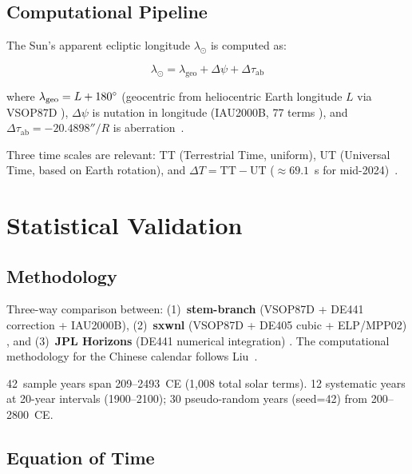 \documentclass[10pt,a4paper]{article}
\begin{document}
\subsection{Computational Pipeline}
\label{subsec:pipeline}

The Sun's apparent ecliptic longitude $\lambda_\odot$ is computed as:

\begin{equation}
  \lambda_\odot = \lambda_{\text{geo}} + \Delta\psi + \Delta\tau_{\text{ab}}
  \label{eq:apparent}
\end{equation}

\noindent where $\lambda_{\text{geo}} = L + 180\degree$ (geocentric from
heliocentric Earth longitude $L$ via VSOP87D \cite{bretagnon1988}),
$\Delta\psi$ is nutation in longitude (IAU2000B, 77 terms \cite{iau2000b}),
and $\Delta\tau_{\text{ab}} = -20.4898'' / R$ is aberration~\cite{ronvondrak1986}.

Three time scales are relevant: TT (Terrestrial Time, uniform), UT (Universal
Time, based on Earth rotation), and $\Delta T = \text{TT} - \text{UT}$
($\approx 69.1$~s for mid-2024)~\cite{nasa_deltaT_uncertainty, stephenson2016}.


\section{Statistical Validation}
\label{sec:validation}

\subsection{Methodology}

Three-way comparison between: (1)~\textbf{stem-branch} (VSOP87D + DE441
correction + IAU2000B), (2)~\textbf{sxwnl} (VSOP87D + DE405 cubic +
ELP/MPP02) \cite{sxwnl_github}, and (3)~\textbf{JPL Horizons} (DE441
numerical integration) \cite{jpl_horizons}. The computational methodology
for the Chinese calendar follows Liu~\cite{ytliu_computation}.

42~sample years span 209--2493~CE (1,008 total solar terms). 12 systematic
years at 20-year intervals (1900--2100); 30 pseudo-random years (seed=42)
from 200--2800~CE.

\subsection{Equation of Time}
\label{subsec:eot}
\end{document}
